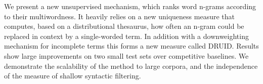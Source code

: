 We present a new unsupervised mechanism, which ranks word n-grams according to their multiwordness. It heavily relies on a new uniqueness measure that computes, based on a distributional thesaurus, how often an n-gram could be replaced in context by a single-worded term. In addition with a downweighting mechanism for incomplete terms this forms a new measure called DRUID. Results show large improvements on two small test sets over competitive baselines. We demonstrate the scalability of the method to large corpora, and the independence of the measure of shallow syntactic filtering.
